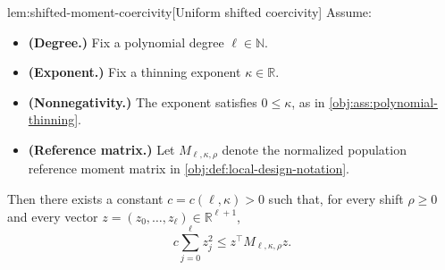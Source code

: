 \documentclass[11pt]{article}
\begin{document}
\begin{lemmav}{lem:shifted-moment-coercivity}[Uniform shifted coercivity]
Assume:
\begin{itemize}
\item \textbf{(Degree.)} Fix a polynomial degree \(\ell\in\mathbb N\).
\item \textbf{(Exponent.)} Fix a thinning exponent \(\kappa\in\mathbb R\).
\item \textbf{(Nonnegativity.)} The exponent satisfies \(0\le \kappa\), as in \cref{obj:ass:polynomial-thinning}.
\item \textbf{(Reference matrix.)} Let \(M_{\ell,\kappa,\rho}\) denote the normalized population reference moment matrix in \cref{obj:def:local-design-notation}.
\end{itemize}
Then there exists a constant \(c=c(\ell,\kappa)>0\) such that, for every shift \(\rho\ge 0\) and every vector \(z=(z_0,\ldots,z_\ell)\in\mathbb R^{\ell+1}\),
\[
c\sum_{j=0}^{\ell} z_j^2
\le
z^\top M_{\ell,\kappa,\rho}z .
\]
\end{lemmav}
\end{document}
